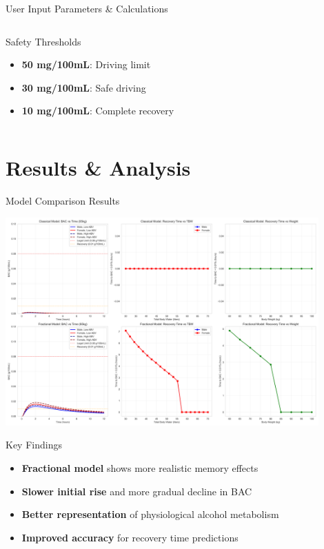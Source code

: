 \documentclass[aspectratio=169]{beamer}
\newcommand{\highlight}[1]{\textcolor{kentech_orange}{\textbf{#1}}}
\newcommand{\safety}[1]{\textcolor{safety_green}{\textbf{#1}}}
\newcommand{\warning}[1]{\textcolor{warning_red}{\textbf{#1}}}
\begin{document}
\begin{frame}{User Input Parameters \& Calculations}
\begin{columns}
\begin{column}{0.5\textwidth}
            \begin{block}{Safety Thresholds}
                \begin{itemize}
                    \item \warning{50 mg/100mL}: Driving limit
                    \item \safety{30 mg/100mL}: Safe driving
                    \item \safety{10 mg/100mL}: Complete recovery
                \end{itemize}
            \end{block}
        \end{column}
    \end{columns}
\end{frame}

\section{Results \& Analysis}

\begin{frame}{Model Comparison Results}
    \begin{center}
        \includegraphics[width=0.9\textwidth]{bac_comparison.png}
    \end{center}
    
    \begin{block}{Key Findings}
        \begin{itemize}
            \item \highlight{Fractional model} shows more realistic memory effects
            \item \highlight{Slower initial rise} and more gradual decline in BAC
            \item \highlight{Better representation} of physiological alcohol metabolism
            \item \highlight{Improved accuracy} for recovery time predictions
        \end{itemize}
    \end{block}
\end{frame}
\end{document}
